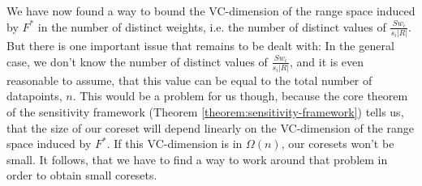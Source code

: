 We have now found a way to bound the VC-dimension of the range space
induced by $F^\ast$ in the number of distinct weights, i.e.
the number of distinct values of $\frac{S w_i}{s_i |R|}$.
But there is one important issue that remains to be dealt with:
In the general case, we don't know the number of distinct
values of $\frac{S w_i}{s_i |R|}$, and it is even reasonable to
assume, that this value can be equal
to the total number of datapoints, $n$.
This would be a problem for us though, because the core theorem
of the sensitivity framework
(Theorem \ref{theorem:sensitivity-framework}) tells us,
that the size of our
coreset will depend linearly on the VC-dimension of the range
space induced by $F^\ast$. If this VC-dimension is in $\Omega(n)$,
our coresets won't be small. It follows, that we have to find
a way to work around that problem in order to obtain small coresets.
